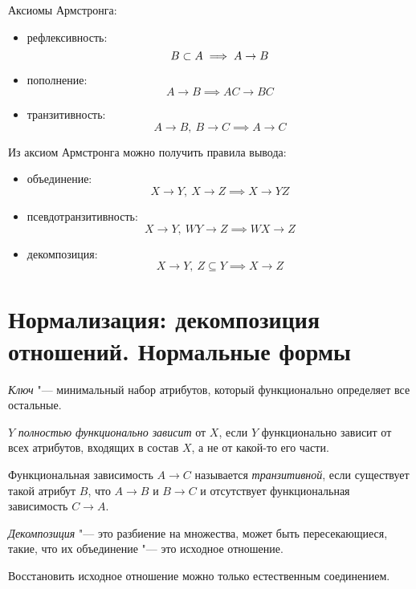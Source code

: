 Аксиомы Армстронга:
\begin{itemize}
	\item рефлексивность:
		$$ B \subset A \implies A \to B $$
	\item пополнение:
		$$ A \to B \implies AC \to BC $$
	\item транзитивность:
		$$ A \to B, ~ B \to C \implies A \to C $$
\end{itemize}

Из аксиом Армстронга можно получить правила вывода:
\begin{itemize}
	\item объединение:
		$$ X \to Y, ~ X \to Z \implies X \to YZ $$
	\item псевдотранзитивность:
		$$ X \to Y, ~ WY \to Z \implies WX \to Z $$
	\item декомпозиция:
		$$ X \to Y, ~ Z \subseteq Y \implies X \to Z $$
\end{itemize}

\section{Нормализация: декомпозиция отношений. Нормальные формы}

\begin{definition}
	\emph{Ключ} "--- минимальный набор атрибутов, который функционально определяет все остальные.
\end{definition}

\begin{definition}
	$ Y $ \emph{полностью функционально зависит} от $ X $, если $ Y $ функционально зависит от всех атрибутов, входящих в состав $ X $, а не от какой-то его части.
\end{definition}

\begin{definition}
	Функциональная зависимость $ A \to C $ называется \emph{транзитивной}, если существует такой атрибут $ B $, что $ A \to B $ и $ B \to C $ и отсутствует функциональная зависимость $ C \to A $.
\end{definition}

\begin{definition}
	\emph{Декомпозиция} "--- это разбиение на множества, может быть пересекающиеся, такие, что их объединение "--- это исходное отношение.
\end{definition}

Восстановить исходное отношение можно только естественным соединением.

